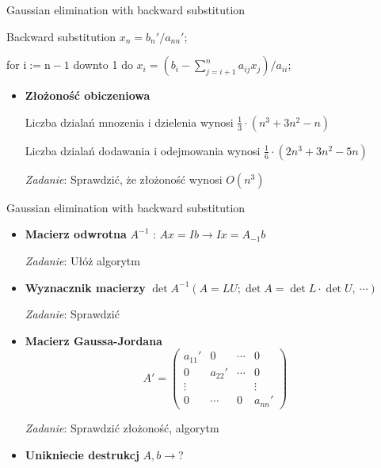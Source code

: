 \begin{frame}{Gaussian elimination with backward substitution}
\begin{exampleblock}{Backward substitution}
$x_{n}=b_{n}'/a_{nn}'$;

for $\mathrm{i}:=\mathrm{n}-1$ downto 1 do $x_{i}=(b_{i}-\displaystyle \sum_{j=i+1}^{n}a_{ij}x_{j})/a_{ii}$;
\end{exampleblock}

\begin{itemize}
\item \textbf{Złożoność obiczeniowa}

Liczba dziala\'{n} mnozenia $\mathrm{i}$ dzielenia wynosi $\displaystyle \frac{1}{3}\cdot(n^{3}+3n^{2}-n)$

Liczba dziala\'{n} dodawania $\mathrm{i}$ odejmowania wynosi $\displaystyle \frac{1}{6}\cdot(2n^{3}+3n^{2}-5n)$

\begin{flushright}
{\it Zadanie}: Sprawdzić, że złożoność wynosi $O(n^{3})$
\end{flushright} 

\end{itemize}

\end{frame}
\begin{frame}{Gaussian elimination with backward substitution}
\begin{itemize}
\item \textbf{Macierz odwrotna} \newline
$A^{-1}$ : $Ax=Ib\rightarrow Ix=A_{-1}b$
\begin{flushright}
{\it Zadanie}: Ułóż algorytm
\end{flushright}
\item \textbf{Wyznacznik macierzy}
$\det A^{-1}(A=LU;\det A=\det L\cdot\det U,\ \cdots)$
\begin{flushright}
{\it Zadanie}: Sprawdzić
\end{flushright}
\item \textbf{Macierz Gaussa-Jordana}
$$
A'=\left(\begin{array}{llll}
a_{11}' & 0 & \cdots & 0\\
0 & a_{22}' & \cdots & 0\\
\vdots &  &  & \vdots\\
 0 & \cdots & 0 & a_{nn}'
\end{array}\right)
$$
\begin{flushright}
{\it Zadanie}: Sprawdzić złożoność, algorytm
\end{flushright}
\item \textbf{Unikniecie destrukcj}
$A,  b\rightarrow$?
\end{itemize}
\end{frame}
